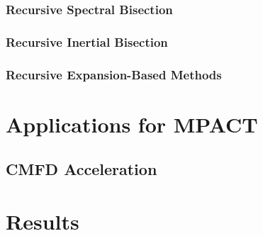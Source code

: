 {{{      \subsubsection{Recursive Spectral Bisection}{\label{sssec:Spatial Decomposition:Recursive Spectral Bisection}
        \blindtext[4]
      }
      \subsubsection{Recursive Inertial Bisection}{\label{sssec:Spatial Decomposition:Recursive Inertial Bisection}
        \blindtext[4]
      }
      \subsubsection{Recursive Expansion-Based Methods}{\label{sssec:Spatial Decomposition:Recursive Expansion-Based Methods}
        \blindtext[8]
      }
    }
  }
  \section{Applications for MPACT}{\label{sec:Spatial Decomposition:Applications for MPACT}
    \blindtext[8]
    \subsection{CMFD Acceleration}{\label{ssec:Spatial Decomposition:CMFD Acceleration}
      \blindtext[3]
    }
  }
  \section{Results}{\label{sec:Spatial Decomposition:Results}
}}
